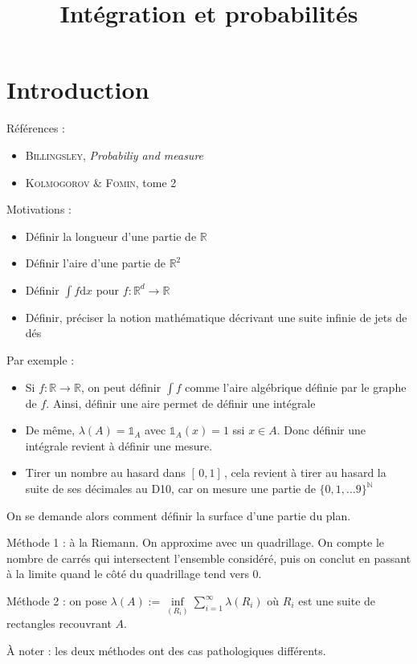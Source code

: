 \documentclass[10pt,a4paper,notitlepage ]{article}
\title{Intégration et probabilités}
\date{}
\begin{document}
	\maketitle
	\part*{Introduction}
	Références : 
	\begin{itemize}
		\item \textsc{Billingsley}, \textit{Probabiliy and measure}
		\item \textsc{Kolmogorov \& Fomin}, tome 2 
	\end{itemize}
	Motivations :
	\begin{itemize}
		\item Définir la longueur d'une partie de $\mathbb R$
		\item Définir l'aire d'une partie de $\mathbb R ^2$
		\item  Définir $\int f \mathrm dx$ pour $f : \mathbb R ^d \rightarrow \mathbb R$
		\item Définir, préciser la notion mathématique décrivant une suite infinie de jets de dés
	\end{itemize}
Par exemple :
\begin{itemize}
	\item Si $f : \mathbb R \rightarrow \mathbb R$, on peut définir $\int f$ comme l'aire algébrique définie par le graphe de $f$. Ainsi, définir une aire permet de définir une intégrale
	\item De même, $\lambda(A) = \mathds 1_A$ avec $\mathds 1_A(x)=1$ ssi $x \in A$. Donc définir une intégrale revient à définir une mesure.
	\item Tirer un nombre au hasard dans $[\,0,1]\,$, cela revient à tirer au hasard la suite de ses décimales au D10, car on mesure une partie de $\{ 0, 1, \dots 9 \}^\mathbb N$
 \end{itemize}

On se demande alors comment définir la surface d'une partie du plan.

Méthode 1 : à la Riemann. On approxime avec un quadrillage. On compte le nombre de carrés qui intersectent l'ensemble considéré, puis on conclut en passant à la limite quand le côté du quadrillage tend vers $0$.

Méthode 2 : on pose $\lambda(A) := \underset{(R_i)}{\inf} \sum_{i=1}^{\infty}  \lambda(R_i)$ où $R_i$ est une suite de rectangles recouvrant $A$.

À noter : les deux méthodes ont des cas pathologiques différents.
\end{document}
